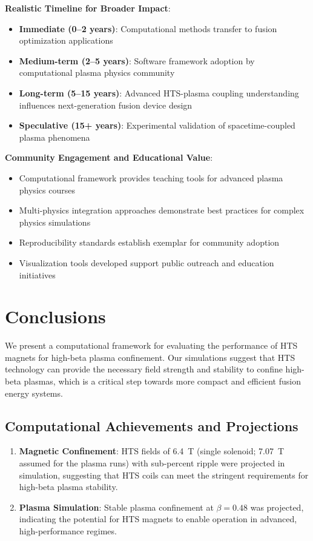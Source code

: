 \documentclass[12pt,a4paper]{article}
\begin{document}
\textbf{Realistic Timeline for Broader Impact}:
\begin{itemize}
\item \textbf{Immediate (0--2 years)}: Computational methods transfer to fusion optimization applications
\item \textbf{Medium-term (2--5 years)}: Software framework adoption by computational plasma physics community
\item \textbf{Long-term (5--15 years)}: Advanced HTS-plasma coupling understanding influences next-generation fusion device design
\item \textbf{Speculative (15+ years)}: Experimental validation of spacetime-coupled plasma phenomena
\end{itemize}

\textbf{Community Engagement and Educational Value}:
\begin{itemize}
\item Computational framework provides teaching tools for advanced plasma physics courses
\item Multi-physics integration approaches demonstrate best practices for complex physics simulations  
\item Reproducibility standards establish exemplar for community adoption
\item Visualization tools developed support public outreach and education initiatives
\end{itemize}

\section{Conclusions}

We present a computational framework for evaluating the performance of HTS magnets for high-beta plasma confinement. Our simulations suggest that HTS technology can provide the necessary field strength and stability to confine high-beta plasmas, which is a critical step towards more compact and efficient fusion energy systems.

\subsection{Computational Achievements and Projections}
\begin{enumerate}
\item \textbf{Magnetic Confinement}: HTS fields of 6.4~T (single solenoid; 7.07~T assumed for the plasma runs) with sub-percent ripple were projected in simulation, suggesting that HTS coils can meet the stringent requirements for high-beta plasma stability.
\item \textbf{Plasma Simulation}: Stable plasma confinement at $\beta=0.48$ was projected, indicating the potential for HTS magnets to enable operation in advanced, high-performance regimes.
\end{enumerate}
\end{document}
